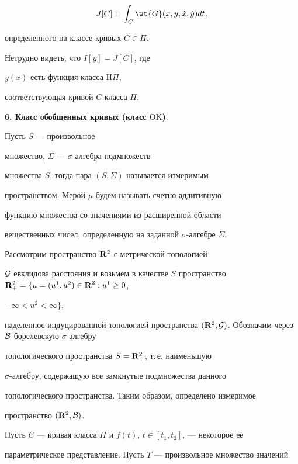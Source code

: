 $$


J[C]=\int_C


\wt{G}(x,y,\Dot{x},\Dot{y})dt,


$$


определенного на классе кривых $C\in \Pi$.


Нетрудно видеть, что $I[y]=J[C]$, где


$y(x)$ есть функция класса $\mathrm H\Pi$,


соответствующая кривой $C$ класса $\Pi$.





{\bf 6. Класс обобщенных кривых (класс $\mathrm{OK}$)}.


Пусть $S$ --- произвольное


множество, $\Sigma$ --- $\sigma$-алгебра подмножеств


множества $S$, тогда пара $(S,\Sigma)$ называется измеримым


пространством. Мерой $\mu$ будем называть счетно-аддитивную


функцию множества со значениями из расширенной области


вещественных чисел, определенную на заданной $\sigma$-алгебре $\Sigma$.





Рассмотрим пространство ${\bold R}^2$ с метрической топологией


${\cal G}$ евклидова расстояния и возьмем в качестве $S$ пространство ${\bold


R}^2_+=\{u=(u^1,u^2)\in{\bold R\/}^2:u^1\geq0$,


$-\infty<u^2<\infty\}$,


наделенное индуцированной топологией пространства $({\bold R}^2,{\cal


G})$. Обозначим через ${\cal B}$ борелевскую $\sigma$-алгебру


топологического пространства $S={\bold R}^2_+$, т.\,е. наименьшую


$\sigma$-алгебру, содержащую все замкнутые подмножества данного


топологического пространства. Таким образом, определено измеримое


пространство $({\bold R}^2,{\cal B})$.





Пусть $C$ --- кривая класса $\Pi$ и $f(t)$, $t\in[t_1,t_2]$, --- некоторое ее


параметрическое представление. Пусть $T$ --- произвольное множество значений


